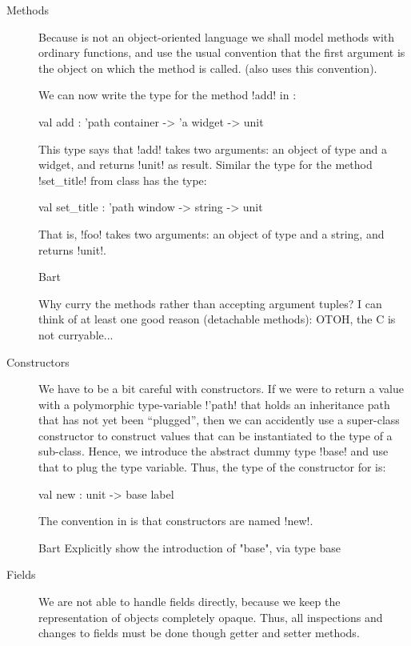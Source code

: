 \documentclass[workingdraft]{usetex-v1}
\begin{document}
\begin{description}
\item[Methods] Because \sml is not an object-oriented language we shall
  model methods with ordinary functions, and use the usual convention
  that the first argument is the object on which the method is called.
  (\gtk also uses this convention).
  
  We can now write the type for the method !add! in
  :
\begin{SMLcode}
val add : 'path container -> 'a widget 
                               -> unit
\end{SMLcode}
This type says that !add! takes two arguments: an object of type
 and a widget, and returns !unit! as result.
Similar the type for the method !set_title! from class
 has the type:
\begin{SMLcode}
val set_title : 'path window -> string 
                               -> unit
\end{SMLcode}
That is, !foo! takes two arguments: an object of type 
 and a string, and returns !unit!.

\begin{ednote}{Bart}
  
Why curry the methods rather than accepting argument tuples?
I can think of at least one good reason (detachable
methods): OTOH, the C is not curryable...

\end{ednote}

\item[Constructors] We have to be a bit careful with constructors.  If
  we were to return a value with a polymorphic type-variable !'path!
  that holds an inheritance path that has not yet been ``plugged'',
  then we can accidently use a super-class constructor to construct
  values that can be instantiated to the type of a sub-class.  Hence,
  we introduce the abstract dummy type !base! and use that to plug the
  type variable.  Thus, the type of the constructor for
   is:
\begin{SMLcode}
val new : unit -> base label
\end{SMLcode}
The convention in \gtk is that constructors are named !new!.

\begin{ednote}{Bart}
  Explicitly show the introduction of "base",
via
   type base
\end{ednote}


\item[Fields] We are not able to handle fields directly, because we
  keep the representation of objects completely opaque.  Thus, all
  inspections and changes to fields must be done though getter and
  setter methods.


\end{description}
\end{document}

